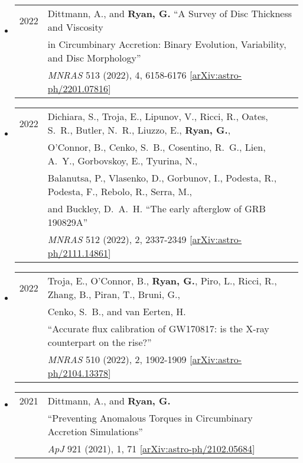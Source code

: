 \begin{itemize}
\item \begin{tabular}{ll}
2022 & {Dittmann}, A., and {\bf {Ryan}, G.}  ``A Survey of Disc Thickness and Viscosity \\
	& in Circumbinary Accretion: Binary Evolution, Variability, and Disc Morphology'' \\
	& \emph{MNRAS} 513 (2022), 4, 6158-6176 [\href{https://arxiv.org/abs/2201.07816}{arXiv:astro-ph/2201.07816}]\\
\end{tabular}	

\item \begin{tabular}{ll}
2022 & {Dichiara}, S., {Troja}, E., {Lipunov}, V., {Ricci}, R., {Oates}, S.~R., {Butler}, N.~R., {Liuzzo}, E., {\bf{Ryan}, G.},\\
	& {O'Connor}, B., {Cenko}, S.~B., {Cosentino}, R.~G., {Lien}, A.~Y., {Gorbovskoy}, E., {Tyurina}, N., \\
	& {Balanutsa}, P., {Vlasenko}, D., {Gorbunov}, I., {Podesta}, R., {Podesta}, F., {Rebolo}, R., {Serra}, M.,\\
	&  and {Buckley}, D.~A.~H. ``The early afterglow of GRB 190829A''\\
	& \emph{MNRAS} 512 (2022), 2, 2337-2349 [\href{https://arxiv.org/abs/2111.14861}{arXiv:astro-ph/2111.14861}]
\end{tabular}

\item \begin{tabular}{ll}
2022 &{Troja}, E., {O'Connor}, B., {\bf{Ryan}, G.}, {Piro}, L., {Ricci}, R., {Zhang}, B., {Piran}, T., {Bruni}, G.,\\
	& {Cenko}, S.~B., and {van Eerten}, H.\\
	& ``Accurate flux calibration of GW170817: is the X-ray counterpart on the rise?''\\
	& \emph{MNRAS} 510 (2022), 2, 1902-1909 [\href{https://arxiv.org/abs/2104.13378}{arXiv:astro-ph/2104.13378}]
\end{tabular}

\item \begin{tabular}{ll}
2021 & {Dittmann}, A., and {\bf {Ryan}, G.}\\ 
	&``Preventing Anomalous Torques in Circumbinary Accretion Simulations''\\
	& \emph{ApJ} 921 (2021), 1, 71 [\href{https://arxiv.org/abs/2102.05684}{arXiv:astro-ph/2102.05684}]\\
\end{tabular}	


\end{itemize}
